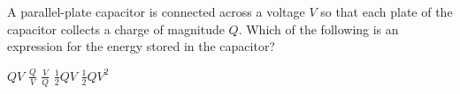 
\begin{questions}
\setcounter{question}{10}

\question
A parallel-plate capacitor is connected across a voltage $V$ so that each plate of the capacitor collects a charge of magnitude $Q$. Which of the following is an expression for the energy stored in the capacitor?

\begin{oneparchoices}
    \choice $Q V$
    \choice $\frac{Q}{V}$
    \choice $\frac{V}{Q}$
    \choice $\frac{1}{2} Q V$
    \choice $\frac{1}{2} Q V^{2}$
\end{oneparchoices}

\end{questions}
